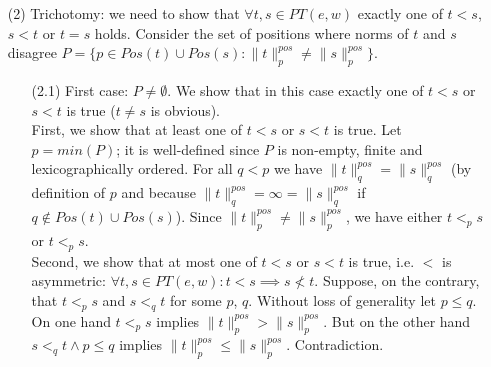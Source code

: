 \documentclass[AMA,STIX1COL]{WileyNJD-v2}
\newcommand{\PT}{PT}
\newcommand{\pnorm}[2]{\|{#1}\|^{pos}_{#2}}
\begin{document}
\begin{proofEnd}
\begin{itemize}[itemsep=0.5em, topsep=0.5em]
        \item[(2)]
            Trichotomy: we need to show that $\forall t, s \in \PT(e,w)$
            exactly one of $t < s$, $s < t$ or $t = s$ holds.
            Consider the set of positions where norms of $t$ and $s$ disagree
            $P = \{p \in Pos(t) \cup Pos(s) : \pnorm{t}{p} \neq \pnorm{s}{p}\}$.
            \begin{itemize}[itemsep=0.5em]
                \item[(2.1)] First case: $P \neq \emptyset$.
                    We show that in this case exactly one of $t < s$ or $s < t$ is true
                    ($t \neq s$ is obvious).
                    \\[0.5em]
                    First, we show that at least one of $t < s$ or $s < t$ is true.
                    Let $p = min(P)$; it is well-defined since $P$ is non-empty, finite and lexicographically ordered.
                    For all $q < p$ we have $\pnorm{t}{q} = \pnorm{s}{q}$ (by definition of $p$
                    and because $\pnorm{t}{q} = \infty = \pnorm{s}{q}$ if $q \not\in Pos(t) \cup Pos(s)$).
                    Since $\pnorm{t}{p} \neq \pnorm{s}{p}$, we have either $t <_p s$ or $t <_p s$.
                    \\[0.5em]
                    Second, we show that at most one of $t < s$ or $s < t$ is true,
                    i.e. $<$ is asymmetric: $\forall t, s \in \PT(e,w) : t < s \implies s \not< t$.
                    Suppose, on the contrary, that $t <_p s$ and $s <_q t$ for some $p$, $q$.
                    Without loss of generality let $p \leq q$.
                    On one hand $t <_p s$ implies $\pnorm{t}{p} > \pnorm{s}{p}$.
                    But on the other hand $s <_q t \wedge p \leq q$ implies $\pnorm{t}{p} \leq \pnorm{s}{p}$.
                    Contradiction.


\end{itemize}
\end{itemize}
\end{proofEnd}
\end{document}
